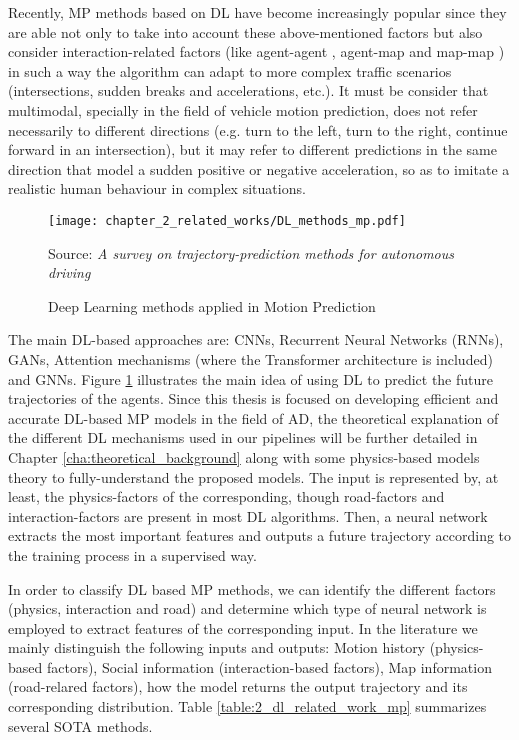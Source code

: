 Recently, MP methods based on DL have become increasingly popular since they are able not only to take into account these above-mentioned factors but also consider interaction-related factors (like agent-agent \cite{gupta2018social}, agent-map \cite{casas2018intentnet} and map-map \cite{liang2020learning}) in such a way the algorithm can adapt to more complex traffic scenarios (intersections, sudden breaks and accelerations, etc.). It must be consider that multimodal, specially in the field of vehicle motion prediction, does not refer necessarily to different directions (e.g. turn to the left, turn to the right, continue forward in an intersection), but it may refer to different predictions in the same direction that model a sudden positive or negative acceleration, so as to imitate a realistic human behaviour in complex situations. %

\begin{figure}[h]
	\centering
	\texttt{[image: chapter\_2\_related\_works/DL\_methods\_mp.pdf]}
	\caption{Deep Learning methods applied in Motion Prediction}
	Source: \textit{A survey on trajectory-prediction methods for autonomous driving} \cite{huang2022survey}
	\label{fig:chapter_2_related_works/DL_example_mp}
\end{figure}

The main DL-based approaches are: \acp{CNN}, Recurrent Neural Networks (RNNs), \acp{GAN}, Attention mechanisms (where the Transformer architecture is included) and \acp{GNN}. Figure \ref{fig:chapter_2_related_works/DL_example_mp} illustrates the main idea of using \ac{DL} to predict the future trajectories of the agents. Since this thesis is focused on developing efficient and accurate \ac{DL}-based \ac{MP} models in the field of \ac{AD}, the theoretical explanation of the different \ac{DL} mechanisms used in our pipelines will be further detailed in Chapter \ref{cha:theoretical_background} along with some physics-based models theory to fully-understand the proposed models. The input is represented by, at least, the physics-factors of the corresponding, though road-factors and interaction-factors are present in most \ac{DL} algorithms. Then, a neural network extracts the most important features and outputs a future trajectory according to the training process in a supervised way. 

In order to classify \ac{DL} based \ac{MP} methods, we can identify the different factors (physics, interaction and road) and determine which type of neural network is employed to extract features of the corresponding input. In the literature we mainly distinguish the following inputs and outputs: Motion history (physics-based factors), Social information (interaction-based factors), Map information (road-relared factors), how the model returns the output trajectory and its corresponding distribution. Table \ref{table:2_dl_related_work_mp} summarizes several SOTA methods.


